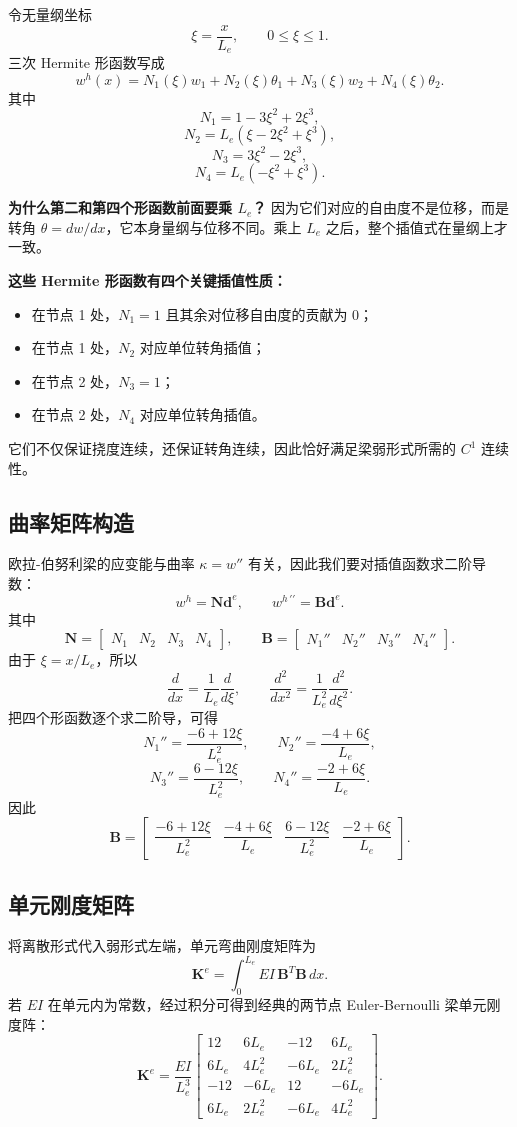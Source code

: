 \documentclass[11pt, a4paper, UTF8]{ctexart}
\begin{document}
令无量纲坐标
\[
\xi = \frac{x}{L_e}, \qquad 0 \le \xi \le 1.
\]
三次 Hermite 形函数写成
\[
w^h(x) = N_1(\xi) w_1 + N_2(\xi) \theta_1 + N_3(\xi) w_2 + N_4(\xi) \theta_2.
\]
其中
\[
N_1 = 1 - 3\xi^2 + 2\xi^3,
\]
\[
N_2 = L_e(\xi - 2\xi^2 + \xi^3),
\]
\[
N_3 = 3\xi^2 - 2\xi^3,
\]
\[
N_4 = L_e(-\xi^2 + \xi^3).
\]

\textbf{为什么第二和第四个形函数前面要乘 $L_e$？}
因为它们对应的自由度不是位移，而是转角 $\theta = dw/dx$，它本身量纲与位移不同。乘上 $L_e$ 之后，整个插值式在量纲上才一致。

\textbf{这些 Hermite 形函数有四个关键插值性质：}
\begin{itemize}
    \item 在节点 1 处，$N_1=1$ 且其余对位移自由度的贡献为 0；
    \item 在节点 1 处，$N_2$ 对应单位转角插值；
    \item 在节点 2 处，$N_3=1$；
    \item 在节点 2 处，$N_4$ 对应单位转角插值。
\end{itemize}
它们不仅保证挠度连续，还保证转角连续，因此恰好满足梁弱形式所需的 $C^1$ 连续性。

\subsection{曲率矩阵构造}
欧拉-伯努利梁的应变能与曲率 $\kappa = w''$ 有关，因此我们要对插值函数求二阶导数：
\[
w^h = \bm{N}\bm{d}^e,
\qquad
w^{h\,\prime\prime} = \bm{B}\bm{d}^e.
\]
其中
\[
\bm{N} =
\begin{bmatrix}
N_1 & N_2 & N_3 & N_4
\end{bmatrix},
\qquad
\bm{B} =
\begin{bmatrix}
N_1'' & N_2'' & N_3'' & N_4''
\end{bmatrix}.
\]
由于 $\xi = x/L_e$，所以
\[
\frac{d}{dx} = \frac{1}{L_e}\frac{d}{d\xi},
\qquad
\frac{d^2}{dx^2} = \frac{1}{L_e^2}\frac{d^2}{d\xi^2}.
\]
把四个形函数逐个求二阶导，可得
\[
N_1'' = \frac{-6 + 12\xi}{L_e^2},
\qquad
N_2'' = \frac{-4 + 6\xi}{L_e},
\]
\[
N_3'' = \frac{6 - 12\xi}{L_e^2},
\qquad
N_4'' = \frac{-2 + 6\xi}{L_e}.
\]
因此
\[
\bm{B} =
\begin{bmatrix}
\dfrac{-6 + 12\xi}{L_e^2} &
\dfrac{-4 + 6\xi}{L_e} &
\dfrac{6 - 12\xi}{L_e^2} &
\dfrac{-2 + 6\xi}{L_e}
\end{bmatrix}.
\]

\subsection{单元刚度矩阵}
将离散形式代入弱形式左端，单元弯曲刚度矩阵为
\[
\bm{K}^e = \int_0^{L_e} EI\, \bm{B}^T \bm{B}\, dx.
\]
若 $EI$ 在单元内为常数，经过积分可得到经典的两节点 Euler-Bernoulli 梁单元刚度阵：
\[
\bm{K}^e
=
\frac{EI}{L_e^3}
\begin{bmatrix}
12 & 6L_e & -12 & 6L_e \\
6L_e & 4L_e^2 & -6L_e & 2L_e^2 \\
-12 & -6L_e & 12 & -6L_e \\
6L_e & 2L_e^2 & -6L_e & 4L_e^2
\end{bmatrix}.
\]
\end{document}
